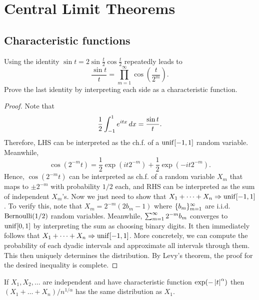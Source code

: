 \documentclass[a4paper]{article}
\newcommand{\convd}{\Rightarrow}
\begin{document}
\section{Central Limit Theorems}

\setcounter{subsection}{2}

\subsection{Characteristic functions}

\begin{ex}[Durrett 3.3.10]
  Using the identity $\sin t = 2 \sin \frac{t}{2} \cos \frac{t}{2}$ 
  repeatedly leads to
  \[
  \frac{\sin t}{t} = \prod_{m=1}^\infty \cos \left( \frac{t}{2^m} \right).
  \]
  Prove the last identity by interpreting each 
  side as a characteristic function.
\end{ex}

\begin{proof}
  Note that 
  \[
  \frac{1}{2} \int_{-1}^1 e^{i t x} \, d x = \frac{\sin t}{t}.
  \]
  Therefore, LHS can be interpreted as the ch.f. of a 
  $\operatorname{unif} [-1, 1]$ random variable. Meanwhile, 
  \[
  \cos \left( 2^{-m} t \right) = \frac{1}{2} \exp (i t 2^{-m}) 
  + \frac{1}{2} \exp (- i t 2^{-m}).
  \]
  Hence, $\cos (2^{-m} t)$ can be interpreted as ch.f. of a random variable 
  $X_m$ that maps to $\pm 2^{-m}$ with probability $1/2$ each, 
  and RHS can be interpreted as the sum of independent $X_m$'s.
  Now we just need to show that $X_1 + \dots + X_n \convd \unif[-1, 1]$. 
  To verify this, note that $X_m = 2^{-m} (2 b_m - 1)$ where 
  $\{ b_m \}_{m=1}^\infty$ are i.i.d.\ $\operatorname{Bernoulli} (1 / 2)$ random 
  variables. Meanwhile, $\sum_{m=1}^\infty 2^{-m} b_m$ converges to 
  $\operatorname{unif}[0, 1]$ by interpreting the sum as choosing binary digits. 
  It then immediately follows that $X_1 + \dots + X_n \convd \unif [-1, 1]$.
  More concretely, we can compute the probability of each dyadic intervals 
  and approximate all intervals through them. This then uniquely determines 
  the distribution.
  By Levy's theorem, the proof for the desired inequality is complete.

\end{proof}

\begin{ex}[Durrett 3.3.20]
  If $X_1, X_2, \dots$ are independent and have characteristic
  function $\exp (- \left\lvert t\right\rvert^\alpha)$ then 
  $(X_1 + \dots + X_n) / n^{1 / \alpha}$ has the same distribution
  as $X_1$.
\end{ex}
\end{document}
